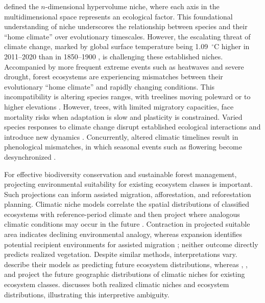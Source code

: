 \documentclass[11pt]{article}
\begin{document}
\citet{hutchinson1957} defined the $n$-dimensional hypervolume niche, where each axis in the multidimensional space represents an ecological factor. This foundational understanding of niche underscores the relationship between species and their ``home climate'' over evolutionary timescales. However, the escalating threat of climate change, marked by global surface temperature being 1.09~$^\circ$C higher in 2011--2020 than in 1850--1900 \citep{ipcc2021}, is challenging these established niches. Accompanied by more frequent extreme events such as heatwaves and severe drought, forest ecosystems are experiencing mismatches between their evolutionary ``home climate'' and rapidly changing conditions. This incompatibility is altering species ranges, with treelines moving poleward or to higher elevations \citep{hansson2021}. However, trees, with limited migratory capacities, face mortality risks when adaptation is slow and plasticity is constrained. Varied species responses to climate change disrupt established ecological interactions and introduce new dynamics \citep{lurgi2012,schweiger2008,schweiger2012}. Concurrently, altered climatic timelines result in phenological mismatches, in which seasonal events such as flowering become desynchronized \citep{bogdziewicz2021}.

For effective biodiversity conservation and sustainable forest management,
projecting environmental suitability for existing ecosystem classes is
important. Such projections can inform assisted migration, afforestation, and
reforestation planning. Climatic niche models correlate the spatial
distributions of classified ecosystems with reference-period climate and then
project where analogous climatic conditions may occur in the future
\citep{hamannWang2006,nwe2020,rehfeldt2012,wang2012,zhang2022}. Contraction in
projected suitable area indicates declining environmental analogy, whereas
expansion identifies potential recipient environments for assisted migration
\citep{oneill2008}; neither outcome directly predicts realized vegetation.
Despite similar methods, interpretations vary. \citet{nwe2020} describe their
models as predicting future ecosystem distributions, whereas
\citet{hamannWang2006}, \citet{wang2012}, and \citet{zhang2022} project the
future geographic distributions of climatic niches for existing ecosystem
classes. \citet{rehfeldt2012} discusses both realized climatic niches and
ecosystem distributions, illustrating this interpretive ambiguity.
\end{document}
